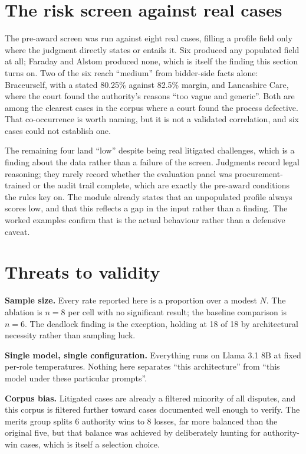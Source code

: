 \section{The risk screen against real cases}
\label{sec:risk-eval}

The pre-award screen was run against eight real cases, filling a profile field
only where the judgment directly states or entails it. Six produced any populated
field at all; Faraday and Alstom produced none, which is itself the finding this
section turns on. Two of the six reach ``medium'' from bidder-side facts alone:
Braceurself, with a stated 80.25\% against 82.5\% margin, and Lancashire Care,
where the court found the authority's reasons ``too vague and generic''. Both are
among the clearest cases in the corpus where a court found the process defective.
That co-occurrence is worth naming, but it is not a validated correlation, and six
cases could not establish one.

The remaining four land ``low'' despite being real litigated challenges, which is
a finding about the data rather than a failure of the screen. Judgments record
legal reasoning; they rarely record whether the evaluation panel was
procurement-trained or the audit trail complete, which are exactly the pre-award
conditions the rules key on. The module already states that an unpopulated profile
always scores low, and that this reflects a gap in the input rather than a
finding. The worked examples confirm that is the actual behaviour rather than a
defensive caveat.

\section{Threats to validity}
\label{sec:threats}

\textbf{Sample size.} Every rate reported here is a proportion over a modest
$N$. The ablation is $n=8$ per cell with no significant result; the baseline
comparison is $n=6$. The deadlock finding is the exception, holding at 18 of 18
by architectural necessity rather than sampling luck.

\textbf{Single model, single configuration.} Everything runs on Llama 3.1 8B at
fixed per-role temperatures. Nothing here separates ``this architecture'' from
``this model under these particular prompts''.

\textbf{Corpus bias.} Litigated cases are already a filtered minority of all
disputes, and this corpus is filtered further toward cases documented well enough
to verify. The merits group splits 6 authority wins to 8 losses, far more balanced
than the original five, but that balance was achieved by deliberately hunting for
authority-win cases, which is itself a selection choice.


